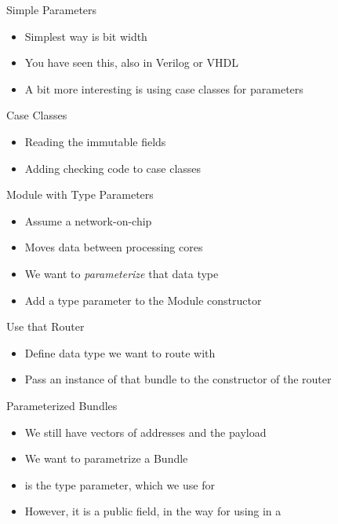 \begin{frame}[fragile]{Simple Parameters}
\begin{itemize}
\item Simplest way is bit width
\item You have seen this, also in Verilog or VHDL
\item A bit more interesting is using case classes for parameters
\end{itemize}
\end{frame}



\begin{frame}[fragile]{Case Classes}
\begin{itemize}
\item Reading the immutable fields
\item Adding checking code to case classes
\end{itemize}
\end{frame}

\begin{frame}[fragile]{Module with Type Parameters}
\begin{itemize}
\item Assume a network-on-chip
\item Moves data between processing cores
\item We want to \emph{parameterize} that data type
\item Add a type parameter  to the Module constructor
\end{itemize}


\end{frame}
\begin{frame}[fragile]{Use that Router}
\begin{itemize}
\item Define data type we want to route with
\item Pass an instance of that bundle to the constructor of the router
\end{itemize}
\end{frame}




\begin{frame}[fragile]{Parameterized Bundles}
\begin{itemize}
\item We still have vectors of addresses and the payload
\item We want to parametrize a Bundle
\item {} is the type parameter, which we use for 
\item However, it is a public field, in the way for using in a 
\end{itemize}
\end{frame}


